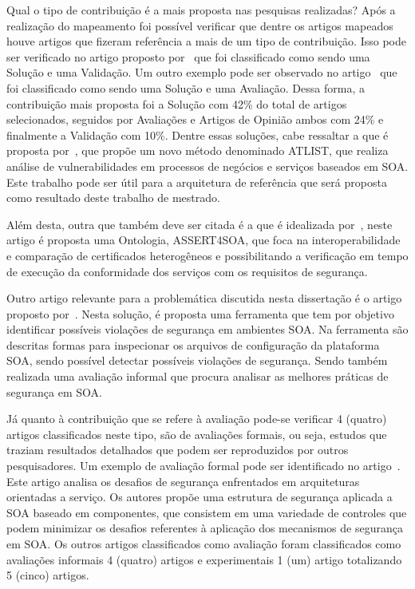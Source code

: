 Qual o tipo de contribuição é a mais proposta nas pesquisas realizadas?
Após a realização do mapeamento foi possível verificar que dentre os artigos mapeados houve artigos que fizeram referência a mais de um tipo de contribuição. Isso pode ser verificado no artigo proposto por~\cite{Delegation_Solution2011} que foi classificado como sendo uma Solução e uma Validação. Um outro exemplo pode ser observado no artigo~\cite{Vulnerability_Analysis2011} que foi classificado como sendo uma Solução e uma Avaliação. Dessa forma, a contribuição mais proposta foi a Solução com 42\% do total de artigos selecionados, seguidos por Avaliações e Artigos de Opinião ambos com 24\% e finalmente a Validação com 10\%. Dentre essas soluções, cabe ressaltar a que é proposta por~\cite{Vulnerability_Analysis2011}, que propõe um novo método denominado ATLIST, que realiza análise de vulnerabilidades em processos de negócios e serviços baseados em SOA. Este trabalho pode ser útil para a arquitetura de referência que será proposta como resultado deste trabalho de mestrado.

Além desta, outra que também deve ser citada é a que é idealizada por~\cite{Ontology2012}, neste artigo é proposta uma Ontologia, ASSERT4SOA, que foca na interoperabilidade e comparação de certificados heterogêneos e possibilitando a verificação em tempo de execução da conformidade dos serviços com os requisitos de segurança.

Outro artigo relevante para a problemática discutida nesta dissertação é o artigo proposto por~\cite {WeberAM07}. Nesta solução, é proposta uma ferramenta que tem por objetivo identificar possíveis violações de segurança em ambientes SOA. Na ferramenta são descritas formas para inspecionar os arquivos de configuração da plataforma SOA, sendo possível detectar possíveis violações de segurança. Sendo também realizada uma avaliação informal que procura analisar as melhores práticas de segurança em SOA.

Já quanto à contribuição que se refere à avaliação pode-se verificar 4 (quatro) artigos classificados neste tipo, são de avaliações formais, ou seja, estudos que traziam resultados detalhados que podem ser reproduzidos por outros pesquisadores. Um exemplo de avaliação formal pode ser identificado no artigo~\cite{Coetzee2012}. Este artigo analisa os desafios de segurança enfrentados em arquiteturas orientadas a serviço. Os autores propõe uma estrutura de segurança aplicada a SOA baseado em componentes, que consistem em uma variedade de controles que podem minimizar os desafios referentes à aplicação dos mecanismos de segurança em SOA. Os outros artigos classificados como avaliação foram classificados como avaliações informais 4 (quatro) artigos e experimentais 1 (um) artigo totalizando 5 (cinco) artigos.

